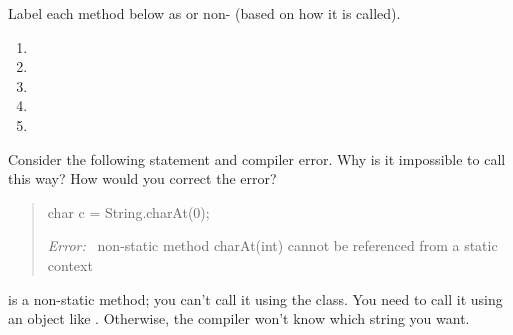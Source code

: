 \Q \label{nonstatic}
Label each method below as  or non- (based on how it is called).

\begin{multicols}{2}
\begin{enumerate}

\item {}

\item {}

\item {}

\item {}

\item {}

\end{enumerate}
\end{multicols}


\Q \label{key2}
Consider the following statement and compiler error.
Why is it impossible to call  this way?
How would you correct the error?

\begin{quote}
\begin{javalst}
char c = String.charAt(0);
\end{javalst}
\textit{Error:~} non-static method charAt(int) cannot be referenced from a static context
\end{quote}

\begin{answer}
 is a non-static method; you can't call it using the  class.
You need to call it using an object like .
Otherwise, the compiler won't know which string you want.
\end{answer}


%
%


